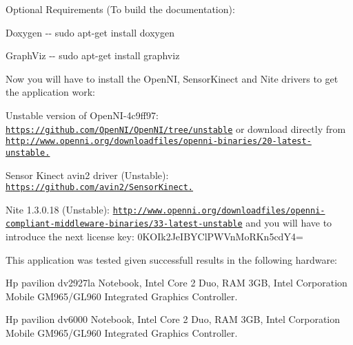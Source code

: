 Optional Requirements (To build the documentation):


\begin{DoxyItemize}
\item Doxygen -\/-\/ sudo apt-\/get install doxygen
\item GraphViz -\/-\/ sudo apt-\/get install graphviz
\end{DoxyItemize}

Now you will have to install the OpenNI, SensorKinect and Nite drivers to get the application work:


\begin{DoxyItemize}
\item Unstable version of OpenNI-\/4c9ff97: \href{https://github.com/OpenNI/OpenNI/tree/unstable}{\tt https://github.com/OpenNI/OpenNI/tree/unstable} or download directly from \href{http://www.openni.org/downloadfiles/openni-binaries/20-latest-unstable.}{\tt http://www.openni.org/downloadfiles/openni-\/binaries/20-\/latest-\/unstable.}
\end{DoxyItemize}


\begin{DoxyItemize}
\item Sensor Kinect avin2 driver (Unstable): \href{https://github.com/avin2/SensorKinect.}{\tt https://github.com/avin2/SensorKinect.}
\end{DoxyItemize}


\begin{DoxyItemize}
\item Nite 1.3.0.18 (Unstable): \href{http://www.openni.org/downloadfiles/openni-compliant-middleware-binaries/33-latest-unstable}{\tt http://www.openni.org/downloadfiles/openni-\/compliant-\/middleware-\/binaries/33-\/latest-\/unstable} and you will have to introduce the next license key: 0KOIk2JeIBYClPWVnMoRKn5cdY4=
\end{DoxyItemize}

This application was tested given successfull results in the following hardware:


\begin{DoxyItemize}
\item Hp pavilion dv2927la Notebook, Intel Core 2 Duo, RAM 3GB, Intel Corporation Mobile GM965/GL960 Integrated Graphics Controller.
\item Hp pavilion dv6000 Notebook, Intel Core 2 Duo, RAM 3GB, Intel Corporation Mobile GM965/GL960 Integrated Graphics Controller.
\end{DoxyItemize}



